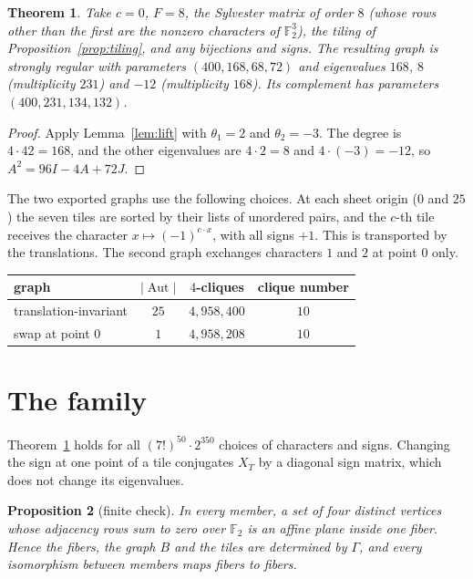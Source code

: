 \documentclass[11pt]{amsart}
\newtheorem{theorem}{Theorem}[section]
\newtheorem{proposition}[theorem]{Proposition}
\theoremstyle{remark}
\newcommand{\F}{\mathbb{F}}
\DeclareMathOperator{\Aut}{Aut}
\begin{document}
\begin{theorem}\label{thm:main}
Take $c=0$, $F=8$, the Sylvester matrix of order $8$ (whose rows other than the first are the nonzero characters of $\F_2^3$), the tiling of Proposition~\ref{prop:tiling}, and any bijections and signs. The resulting graph is strongly regular with parameters $(400,168,68,72)$ and eigenvalues $168$, $8$ (multiplicity $231$) and $-12$ (multiplicity $168$). Its complement has parameters $(400,231,134,132)$.
\end{theorem}

\begin{proof}
Apply Lemma~\ref{lem:lift} with $\theta_1=2$ and $\theta_2=-3$. The degree is $4\cdot42=168$, and the other eigenvalues are $4\cdot2=8$ and $4\cdot(-3)=-12$, so $A^2=96I-4A+72J$.
\end{proof}

The two exported graphs use the following choices. At each sheet origin ($0$ and $25$) the seven tiles are sorted by their lists of unordered pairs, and the $c$-th tile receives the character $x\mapsto(-1)^{c\cdot x}$, with all signs $+1$. This is transported by the translations. The second graph exchanges characters $1$ and $2$ at point $0$ only.
\begin{center}\small
\begin{tabular}{lccc}
\toprule
graph & $|\Aut|$ & $4$-cliques & clique number\\
\midrule
translation-invariant & $25$ & $4{,}958{,}400$ & $10$\\
swap at point $0$ & $1$ & $4{,}958{,}208$ & $10$\\
\bottomrule
\end{tabular}
\end{center}

\section{The family}\label{sec:family}

Theorem~\ref{thm:main} holds for all $(7!)^{50}\cdot2^{350}$ choices of characters and signs. Changing the sign at one point of a tile conjugates $X_T$ by a diagonal sign matrix, which does not change its eigenvalues.

\begin{proposition}[finite check]\label{prop:fibers}
In every member, a set of four distinct vertices whose adjacency rows sum to zero over $\F_2$ is an affine plane inside one fiber. Hence the fibers, the graph $B$ and the tiles are determined by $\Gamma$, and every isomorphism between members maps fibers to fibers.
\end{proposition}
\end{document}
